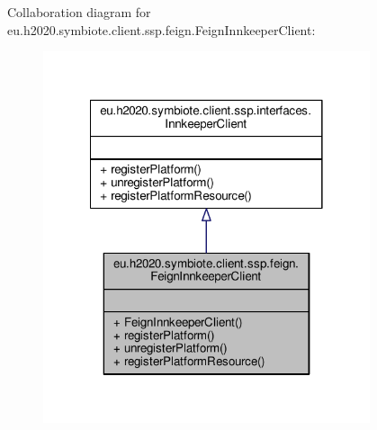 Collaboration diagram for eu.\+h2020.\+symbiote.\+client.\+ssp.\+feign.\+Feign\+Innkeeper\+Client\+:\nopagebreak
\begin{figure}[H]
\begin{center}
\leavevmode
\includegraphics[width=272pt]{classeu_1_1h2020_1_1symbiote_1_1client_1_1ssp_1_1feign_1_1FeignInnkeeperClient__coll__graph}
\end{center}
\end{figure}

